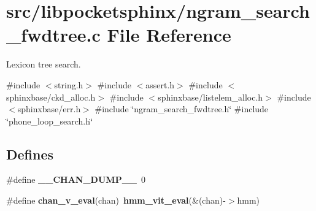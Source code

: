\section{src/libpocketsphinx/ngram\-\_\-search\-\_\-fwdtree.c \-File \-Reference}
\label{ngram__search__fwdtree_8c}


\-Lexicon tree search.  


{\ttfamily \#include $<$string.\-h$>$}\*
{\ttfamily \#include $<$assert.\-h$>$}\*
{\ttfamily \#include $<$sphinxbase/ckd\-\_\-alloc.\-h$>$}\*
{\ttfamily \#include $<$sphinxbase/listelem\-\_\-alloc.\-h$>$}\*
{\ttfamily \#include $<$sphinxbase/err.\-h$>$}\*
{\ttfamily \#include \char`\"{}ngram\-\_\-search\-\_\-fwdtree.\-h\char`\"{}}\*
{\ttfamily \#include \char`\"{}phone\-\_\-loop\-\_\-search.\-h\char`\"{}}\*
\subsection*{\-Defines}
\begin{DoxyCompactItemize}
\item 
\#define {\bfseries \-\_\-\-\_\-\-C\-H\-A\-N\-\_\-\-D\-U\-M\-P\-\_\-\-\_\-}~0\label{ngram__search__fwdtree_8c_a58360b0a332f35742f89edce94c649aa}

\item 
\#define {\bfseries chan\-\_\-v\-\_\-eval}(chan)~{\bf hmm\-\_\-vit\-\_\-eval}(\&(chan)-\/$>$hmm)\label{ngram__search__fwdtree_8c_a268c1fbc6483e1ab06c007222f08d9ad}

\end{DoxyCompactItemize}
